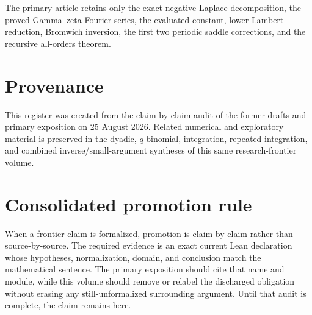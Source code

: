 \documentclass[11pt,oneside]{article}
\theoremstyle{definition}
\theoremstyle{remark}
\begin{document}
The primary article retains only the exact negative-Laplace decomposition, the proved
Gamma--zeta Fourier series, the evaluated constant, lower-Lambert reduction, Bromwich
inversion, the first two periodic saddle corrections, and the recursive all-orders theorem.

\section{Provenance}

This register was created from the claim-by-claim audit of the former drafts and primary
exposition on 25 August 2026.  Related numerical and exploratory material is preserved in
the dyadic, \(q\)-binomial, integration, repeated-integration, and combined inverse/small-argument
syntheses of this same research-frontier volume.


\clearpage
\section*{Consolidated promotion rule}
When a frontier claim is formalized, promotion is claim-by-claim rather than
source-by-source.  The required evidence is an exact current Lean declaration whose
hypotheses, normalization, domain, and conclusion match the mathematical sentence.  The
primary exposition should cite that name and module, while this volume should remove or
relabel the discharged obligation without erasing any still-unformalized surrounding
argument.  Until that audit is complete, the claim remains here.
\end{document}
